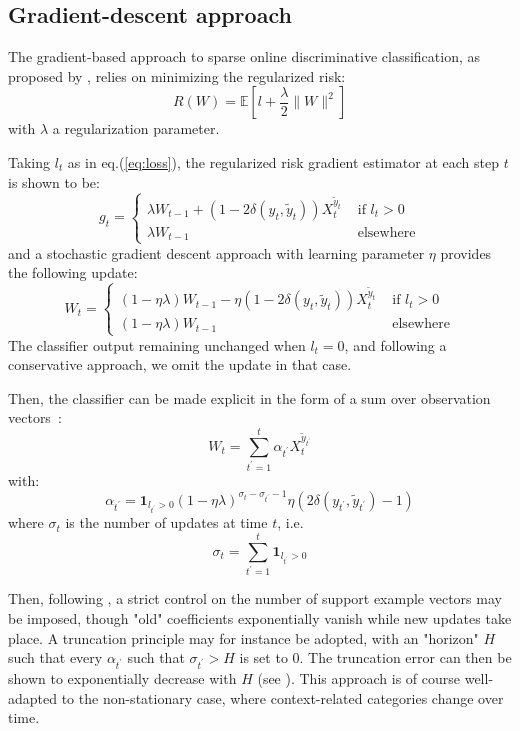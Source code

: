 \documentclass[preprint,12pt,authoryear]{elsarticle}
\begin{document}
\subsection{Gradient-descent approach}

The gradient-based approach to sparse online discriminative classification, as proposed by \cite{kivinen2004online}, relies on minimizing the regularized risk:
$$R(W) = \mathbb{E}\left[ l + \frac{\lambda}{2}\|W\|^2\right]$$
with $\lambda$ a regularization parameter.

Taking $l_t$ as in eq.(\ref{eq:loss}), the regularized risk gradient estimator at each step $t$ is shown to be:
$$g_t = \left\{
\begin{array}{ll}
\lambda W_{t-1} + (1 - 2 \delta(y_t,\tilde{y}_t)) X_t^{\tilde{y}_t} &\text{ if } l_t > 0\\
\lambda W_{t-1} &\text{ elsewhere}
\end{array}
\right.$$
and a stochastic gradient descent approach with learning parameter $\eta$ provides the following update:
$$W_t =  \left\{
\begin{array}{ll}
(1-\eta\lambda) W_{t-1} - \eta (1 - 2 \delta(y_t,\tilde{y}_t)) X_t^{\tilde{y}_t} &\text{ if } l_t > 0\\
(1-\eta\lambda) W_{t-1} &\text{ elsewhere}
\end{array}
\right.$$
The classifier output remaining unchanged when $l_t = 0$, and following a conservative approach, we omit the update in that case. 

Then, the classifier can be made explicit in the form of a sum over observation vectors~:
$$W_t = \sum_{t^\prime=1}^t \alpha_{t^\prime} X_t^{\tilde{y}_{t^\prime}}$$
with:
$$\alpha_{t^\prime} = \mathbf{1}_{l_{t^\prime} > 0}(1 - \eta \lambda)^{\sigma_t - \sigma_{t^\prime}-1}  \eta (2\delta(y_{t^\prime},\tilde{y}_{t^\prime})-1)$$
where $\sigma_t$ is the number of updates at time $t$, i.e.
$$\sigma_t = \sum_{t^\prime=1}^t \mathbf{1}_{l_{t^\prime} > 0}$$  

Then, following \cite{kivinen2004online}, a strict control on the number of support example vectors may be imposed, though "old" coefficients exponentially vanish while new updates take place. A truncation principle may for instance be adopted, with an "horizon" $H$ such that every $\alpha_{t^\prime}$ such that $\sigma_{t^\prime} > H$ is set to 0. The truncation error can then be shown to  exponentially decrease with $H$ (see \cite{kivinen2004online}). This approach is of course well-adapted to the non-stationary case, where context-related categories change over time.
\end{document}

